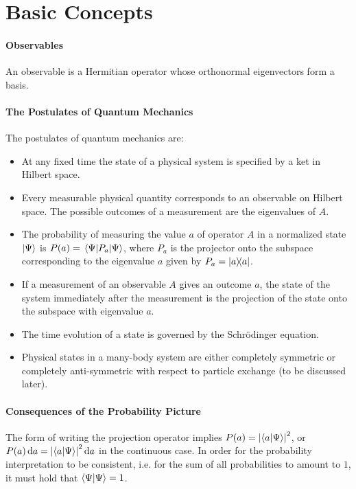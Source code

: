 \section{Basic Concepts}

\paragraph{Observables}
An observable is a Hermitian operator whose orthonormal eigenvectors form a basis.

\paragraph{The Postulates of Quantum Mechanics}
The postulates of quantum mechanics are:
\begin{itemize}
	\item At any fixed time the state of a physical system is specified by a ket in Hilbert space.
	\item Every measurable physical quantity corresponds to an observable on Hilbert space. The possible outcomes of a measurement are the eigenvalues of $A$.
	\item The probability of measuring the value $a$ of operator $A$ in a normalized state $\ket{\Psi}$ is $P(a) = \expval{P_{a}}{\Psi}$, where $P_{a}$ is the projector onto the subspace corresponding to the eigenvalue $a$ given by $P_{a} = \dyad{a}{a}$.
	\item If a measurement of an observable $A$ gives an outcome $a$, the state of the system immediately after the measurement is the projection of the state onto the subspace with eigenvalue $a$.
	\item The time evolution of a state is governed by the Schrödinger equation.
	\item Physical states in a many-body system are either completely symmetric or completely anti-symmetric with respect to particle exchange (to be discussed later).
\end{itemize}

\paragraph{Consequences of the Probability Picture}
The form of writing the projection operator implies $P(a) = \abs{\bra{a}\ket{\Psi}}^{2}$, or $P(a)\dd{a} = \abs{\bra{a}\ket{\Psi}}^{2}\dd{a}$ in the continuous case. In order for the probability interpretation to be consistent, i.e. for the sum of all probabilities to amount to $1$, it must hold that $\bra{\Psi}\ket{\Psi} = 1$.

